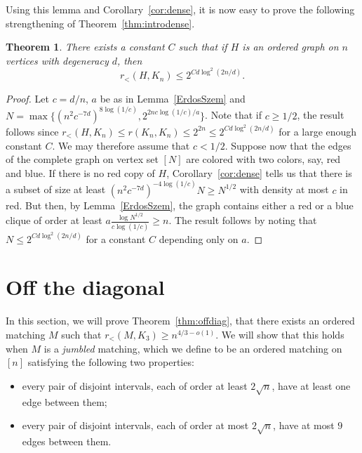\documentclass[11pt]{article}
\newtheorem{theorem}{Theorem}[section]
\begin{document}
Using this lemma and Corollary~\ref{cor:dense}, it is now easy to prove the following strengthening of Theorem~\ref{thm:introdense}.

\begin{theorem}
There exists a constant $C$ such that if $H$ is an ordered graph on $n$ vertices with degeneracy $d$, then 
$$r_{<}(H,K_n) \leq 2^{C d \log^2(2n/d)}.$$
\end{theorem}

\begin{proof}
Let $c = d/n$, $a$ be as in Lemma~\ref{ErdosSzem} and $N = \max\{(n^2 c^{-7d})^{8 \log(1/c)}, 2^{2 n c \log(1/c)/a}\}$. Note that if $c \geq 1/2$, the result follows since $r_<(H,K_n) \le r(K_n,K_n) \le 2^{2n} \leq 2^{C d \log^2(2n/d)}$ for a large enough constant $C$. We may therefore assume that $c < 1/2$. Suppose now that the edges of the complete graph on vertex set $[N]$ are colored with two colors, say, red and blue. If there is no red copy of $H$, Corollary~\ref{cor:dense} tells us that there is a subset of size at least $(n^2 c^{-7d})^{-4 \log(1/c)} N \geq N^{1/2}$ with density at most $c$ in red. But then, by Lemma~\ref{ErdosSzem}, the graph contains either a red or a blue clique of order at least $a\frac{\log N^{1/2}}{c \log (1/c)} \geq n$. The result follows by noting that $N \leq 2^{C d \log^2(2n/d)}$ for a constant $C$ depending only on $a$. 
\end{proof}

\section{Off the diagonal} \label{sec:offdiag}

In this section, we will prove Theorem~\ref{thm:offdiag}, that there exists an ordered matching $M$ such that $r_<(M, K_3) \ge n^{4/3 - o(1)}$. We will show that this holds when $M$ is a {\it jumbled} matching, which we define to be an ordered matching on $[n]$ satisfying the following two properties:
\begin{itemize}
\item
every pair of disjoint intervals, each of order at least $2 \sqrt{n}$, have at least one edge between them; 

\item
every pair of disjoint intervals, each of order at most $2 \sqrt{n}$, have at most $9$ edges between them.
\end{itemize}
\end{document}
